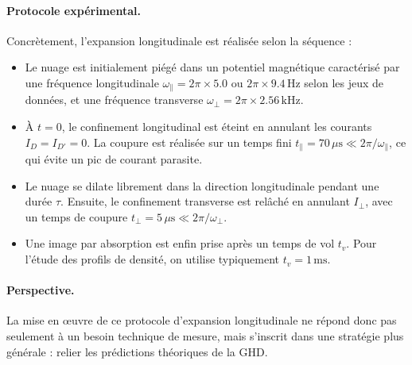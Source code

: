 \paragraph{Protocole expérimental.}
Concrètement, l’expansion longitudinale est réalisée selon la séquence :
\begin{itemize}[label = $\bullet$]
  \item Le nuage est initialement piégé dans un potentiel magnétique caractérisé par une fréquence longitudinale $\omega_{\parallel} = 2 \pi \times  5.0$ ou $2 \pi \times  9.4\,\mathrm{Hz}$ selon les jeux de données, et une fréquence transverse $\omega_{\perp} = 2 \pi \times  2.56\,\mathrm{kHz}$.
  \item À $t=0$, le confinement longitudinal est éteint en annulant les courants $I_D=I_{D'}=0$. La coupure est réalisée sur un temps fini $t_{\parallel} = 70\,\mu\mathrm{s} \ll 2 \pi /\omega_{\parallel}$, ce qui évite un pic de courant parasite.%
  \item Le nuage se dilate librement dans la direction longitudinale pendant une durée $\tau$. Ensuite, le confinement transverse est relâché en annulant $I_{\perp}$, avec un temps de coupure $t_{\perp} = 5\,\mu\mathrm{s} \ll 2 \pi /\omega_{\perp}$.
  \item Une image par absorption est enfin prise après un temps de vol $t_v$. Pour l’étude des profils de densité, on utilise typiquement $t_v = 1\,\mathrm{ms}$.
\end{itemize}


\paragraph{Perspective.}
La mise en œuvre de ce protocole d’expansion longitudinale ne répond donc pas seulement à un besoin technique de mesure, mais s’inscrit dans une stratégie plus générale : relier les prédictions théoriques de la \gls{GHD}.%

